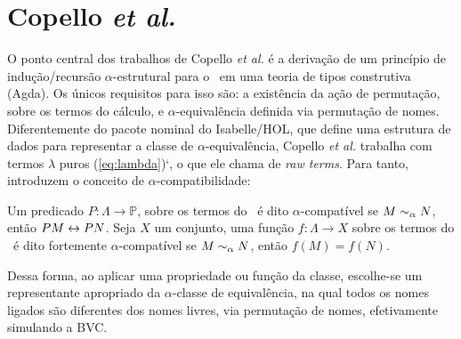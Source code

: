 \section{Copello \textit{et al.}}\label{sec:copello}
O ponto central dos trabalhos de Copello \textit{et al.} \cite{Copello2016,Copello2018} é a derivação de um princípio de indução/recursão $\alpha$-estrutural para o \lcalc~em uma teoria de tipos construtiva (Agda). Os únicos requisitos para isso são: a existência da ação de permutação, sobre os termos do cálculo, e $\alpha$-equivalência definida via permutação de nomes. Diferentemente do pacote nominal do Isabelle/HOL, que define uma estrutura de dados para representar a classe de $\alpha$-equivalência, Copello \textit{et al.} trabalha com termos $\lambda$ puros (\ref{eq:lambda})`, o que ele chama de \textit{raw terms}. Para tanto, introduzem o conceito de $\alpha$-compatibilidade:
\begin{definicao}\label{def:alpha-compatibilidade}
Um predicado $P: \Lambda \rightarrow \mathbb{P}$, sobre os termos do \lcalc~é dito $\alpha$-compatível se $M \sim_{\alpha} N$, então $P M \leftrightarrow P N$.
Seja $X$ um conjunto, uma função $f: \Lambda \rightarrow X$ sobre os termos do \lcalc~é dito fortemente $\alpha$-compatível se $M \sim_{\alpha} N$, então $f(M) = f(N)$.
\end{definicao}\noindent
Dessa forma, ao aplicar uma propriedade ou função da classe, escolhe-se um representante apropriado da $\alpha$-classe de equivalência, na qual todos os nomes ligados são diferentes dos nomes livres, via permutação de nomes, efetivamente simulando a BVC.

